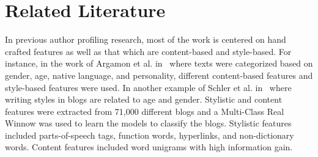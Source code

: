 \documentclass[conference]{IEEEtran}
\begin{document}
%



\section{Related Literature}
In previous author profiling research, most of the work is centered on hand crafted features as well as that which are content-based and style-based. For instance, in the work of Argamon et al. in~\cite{argamon2009automatically} where texts were categorized based on gender, age, native language, and personality, different content-based features and style-based features were used. In another example of Schler et al. in~\cite{schler2006effects} where writing styles in blogs are related to age and gender. Stylistic and content features were extracted from 71,000 different blogs and a Multi-Class Real Winnow was used to learn the models to classify the blogs. Stylistic features included parts-of-speech tags, function words, hyperlinks, and non-dictionary words. Content features included word unigrams with high information gain. %
\end{document}
